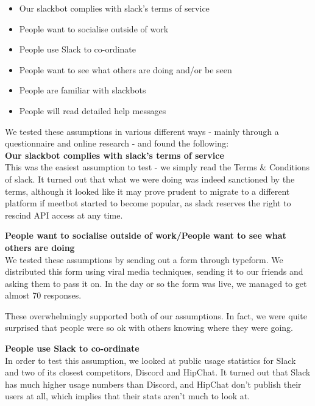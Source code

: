 \documentclass[12pt]{report}
\begin{document}
\begin{itemize}
	\item Our slackbot complies with slack's terms of service
	\item People want to socialise outside of work
	\item People use Slack to co-ordinate
	\item People want to see what others are doing and/or be seen
	\item People are familiar with slackbots
	\item People will read detailed help messages
\end{itemize}

We tested these assumptions in various different ways - mainly through a questionnaire and online research - and found the following:\\

\textbf{Our slackbot complies with slack's terms of service}\\
This was the easiest assumption to test - we simply read the Terms \& Conditions of slack. It turned out that what we were doing was indeed sanctioned by the terms, although it looked like it may prove prudent to migrate to a different platform if meetbot started to become popular, as slack reserves the right to rescind API access at any time.

\vspace{3mm}

\textbf{People want to socialise outside of work/People want to see what others are doing}\\
We tested these assumptions by sending out a form through typeform. We distributed this form using viral media techniques, sending it to our friends and asking them to pass it on. In the day or so the form was live, we managed to get almost 70 responses.

\vspace{3mm}

These overwhelmingly supported both of our assumptions. In fact, we were quite surprised that people were so ok with others knowing where they were going.

\vspace{3mm}

\textbf{People use Slack to co-ordinate}\\
In order to test this assumption, we looked at public usage statistics for Slack and two of its closest competitors, Discord and HipChat. It turned out that Slack has much higher usage numbers than Discord, and HipChat don't publish their users at all, which implies that their stats aren't much to look at.
\end{document}
